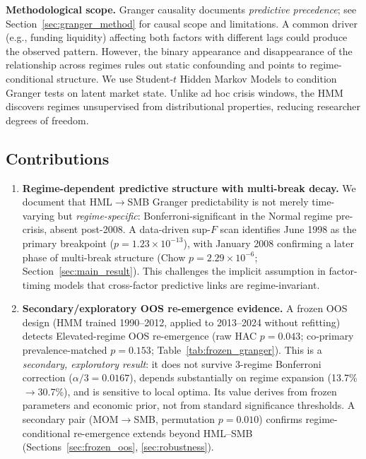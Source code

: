 \documentclass[sigconf,anonymous]{acmart}
\begin{document}
\textbf{Methodological scope.} Granger causality documents \emph{predictive
precedence}; see Section~\ref{sec:granger_method} for causal scope and limitations.
A common driver (e.g., funding liquidity) affecting both factors with different
lags could produce the observed pattern. However, the binary appearance and
disappearance of the relationship across regimes rules out static confounding
and points to regime-conditional structure.
We use Student-$t$ Hidden Markov Models to condition Granger tests on latent
market state. Unlike ad hoc crisis windows, the HMM discovers regimes
unsupervised from distributional properties, reducing researcher degrees of
freedom.

\subsection{Contributions}

\begin{enumerate}
    \item \textbf{Regime-dependent predictive structure with multi-break decay.}
    We document that HML$\to$SMB Granger predictability is not merely time-varying
    but \emph{regime-specific}: Bonferroni-significant in the Normal regime
    pre-crisis, absent post-2008. A data-driven sup-$F$ scan identifies
    June 1998 as the primary breakpoint ($p = 1.23\times10^{-13}$), with
    January 2008 confirming a later phase of multi-break structure
    (Chow $p = 2.29\times10^{-6}$; Section~\ref{sec:main_result}).
    This challenges the implicit assumption
    in factor-timing models that cross-factor predictive links are
    regime-invariant.

    \item \textbf{Secondary/exploratory OOS re-emergence evidence.}
    A frozen OOS design (HMM trained 1990--2012, applied to 2013--2024
    without refitting) detects Elevated-regime OOS re-emergence
    (raw HAC $p = 0.043$; co-primary prevalence-matched $p = 0.153$;
    Table~\ref{tab:frozen_granger}). This is a \emph{secondary, exploratory result}:
    it does not survive 3-regime Bonferroni correction ($\alpha/3 = 0.0167$),
    depends substantially on regime expansion (13.7\%$\to$30.7\%), and is
    sensitive to local optima. Its value derives from frozen parameters and
    economic prior, not from standard significance thresholds.
    A secondary pair (MOM$\to$SMB, permutation $p = 0.010$) confirms
    regime-conditional re-emergence extends beyond HML--SMB
    (Sections~\ref{sec:frozen_oos}, \ref{sec:robustness}).
\end{enumerate}
\end{document}
